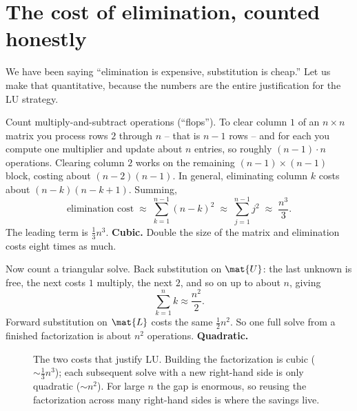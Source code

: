 \section{The cost of elimination, counted honestly}
\label{ch09:cost}

We have been saying ``elimination is expensive, substitution is cheap.'' Let us make that
quantitative, because the numbers are the entire justification for the LU strategy.

Count multiply-and-subtract operations (``flops''). To clear column $1$ of an $n\times n$
matrix you process rows $2$ through $n$ -- that is $n-1$ rows -- and for each you compute one
multiplier and update about $n$ entries, so roughly $(n-1)\cdot n$ operations. Clearing
column $2$ works on the remaining $(n-1)\times(n-1)$ block, costing about $(n-2)(n-1)$. In
general, eliminating column $k$ costs about $(n-k)(n-k+1)$. Summing,
\[
  \text{elimination cost} \;\approx\; \sum_{k=1}^{n-1} (n-k)^2 \;\approx\; \sum_{j=1}^{n-1} j^2
  \;\approx\; \frac{n^3}{3}.
\]
The leading term is $\tfrac13 n^3$. \textbf{Cubic.} Double the size of the matrix and
elimination costs eight times as much.

Now count a triangular solve. Back substitution on $\mat{U}$: the last unknown is free, the
next costs $1$ multiply, the next $2$, and so on up to about $n$, giving
\[
  \sum_{k=1}^{n} k \approx \frac{n^2}{2}.
\]
Forward substitution on $\mat{L}$ costs the same $\tfrac12 n^2$. So one full solve from a
finished factorization is about $n^2$ operations. \textbf{Quadratic.}

\begin{figure}[H]
\centering
{}
\caption{The two costs that justify LU. Building the factorization is cubic ($\sim\tfrac13
n^3$); each subsequent solve with a new right-hand side is only quadratic ($\sim n^2$). For
large $n$ the gap is enormous, so reusing the factorization across many right-hand sides is
where the savings live.}
\label{ch09:fig-cost}
\end{figure}

